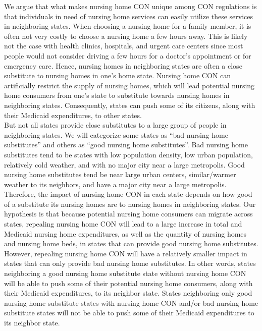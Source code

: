 \documentclass[../Main.tex]{subfiles}
\begin{document}
\indent We argue that what makes nursing home CON unique among CON regulations is that individuals in need of nursing home services can easily utilize these services in neighboring states. When choosing a nursing home for a family member, it is often not very costly to choose a nursing home a few hours away. This is likely not the case with health clinics, hospitals, and urgent care centers since most people would not consider driving a few hours for a doctor’s appointment or for emergency care. Hence, nursing homes in neighboring states are often a close substitute to nursing homes in one’s home state. Nursing home CON can artificially restrict the supply of nursing homes, which will lead potential nursing home consumers from one’s state to substitute towards nursing homes in neighboring states. Consequently, states can push some of its citizens, along with their Medicaid expenditures, to other states.\\
\indent But not all states provide close substitutes to a large group of people in neighboring states. We will categorize some states as “bad nursing home substitutes” and others as “good nursing home substitutes”. Bad nursing home substitutes tend to be states with low population density, low urban population, relatively cold weather, and with no major city near a large metropolis. Good nursing home substitutes tend be near large urban centers, similar/warmer weather to its neighbors, and have a major city near a large metropolis. Therefore, the impact of nursing home CON in each state depends on how good of a substitute its nursing homes are to nursing homes in neighboring states. Our hypothesis is that because potential nursing home consumers can migrate across states, repealing nursing home CON will lead to a large increase in total and Medicaid nursing home expenditures, as well as the quantity of nursing homes and nursing home beds, in states that can provide good nursing home substitutes. However, repealing nursing home CON will have a relatively smaller impact in states that can only provide bad nursing home substitutes. In other words, states neighboring a good nursing home substitute state without nursing home CON will be able to push some of their potential nursing home consumers, along with their Medicaid expenditures, to its neighbor state. States neighboring only good nursing home substitute states with nursing home CON and/or bad nursing home substitute states will not be able to push some of their Medicaid expenditures to its neighbor state.  \\
\end{document}
